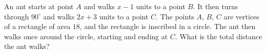 An ant starts at point $A$ and walks $x-1$ units to a point $B$. It then turns through $90^\circ$ and walks $2x+3$ units to a point $C$. The points $A$, $B$, $C$ are vertices of a rectangle of area $18$, and the rectangle is inscribed in a circle. The ant then walks once around the circle, starting and ending at $C$. What is the total distance the ant walks?
